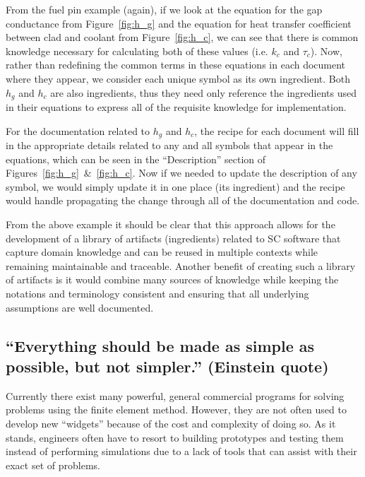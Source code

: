 \documentclass[10pt, preprint]{sigplanconf}
\begin{document}
From the fuel pin example (again), if we look at the equation for the gap
conductance from Figure~\ref{fig:h_g} and the equation for heat transfer 
coefficient between clad and coolant from Figure~\ref{fig:h_c}, 
we can see that there is common knowledge necessary for calculating both 
of these values (i.e. $k_{c}$ and $\tau_c$). Now, rather than redefining the 
common terms in these equations in each document where they appear, 
we consider each unique symbol as its own ingredient. 
Both $h_g$ and $h_c$ are also ingredients, thus they need only
reference the ingredients used in their equations to express all of the
requisite knowledge for implementation.

For the documentation related to $h_g$ and $h_c$, the recipe for each document
will fill in the appropriate details related to any and all symbols that appear
in the equations, which can be seen in the ``Description'' section of 
Figures~\ref{fig:h_g}~\&~\ref{fig:h_c}. Now if we needed to update the 
description of any symbol, we would simply update it in one place (its
ingredient) and the recipe would handle propagating the change through all
of the documentation and code.

From the above example it should be clear that this approach allows for the
development of a library of artifacts (ingredients) related to SC software
that capture domain knowledge and can be reused in multiple contexts while
remaining maintainable and traceable. Another benefit of creating such a library
of artifacts is it would combine many sources of knowledge while keeping
the notations and terminology consistent and ensuring that all underlying 
assumptions are well documented.


\subsection{``Everything should be made as simple as possible, but not
  simpler.'' (Einstein quote)}  \label{subsec:everything}

Currently there exist many powerful, general commercial programs for solving
problems using the finite element method. However, they are not often used
to develop new ``widgets'' because of the cost and complexity of doing so.
As it stands, engineers often have to resort to building prototypes and testing
them instead of performing simulations due to a lack of tools that can assist
with their exact set of problems.
\end{document}
